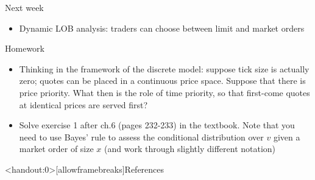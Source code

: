 \documentclass[english,10pt
,aspectratio=169
]{beamer}
\begin{document}
\begin{frame}{Next week}
	\begin{itemize}
		\item Dynamic LOB analysis: traders can choose between limit and market orders
	\end{itemize}
\end{frame}


\begin{frame}{Homework}
	\begin{itemize}
		\item Thinking in the framework of the discrete model: suppose tick size is actually zero; quotes can be placed in a continuous price space. Suppose that there is price priority. What then is the role of time priority, so that first-come quotes at identical prices are served first?
		\item Solve exercise 1 after ch.6 (pages 232-233) in the textbook. Note that you need to use Bayes' rule to assess the conditional distribution over $v$ given a market order of size $x$ (and work through slightly different notation)
	\end{itemize}
\end{frame}





\appendix
\begin{frame}<handout:0>[allowframebreaks]{References}
	
	
\end{frame}
\end{document}
